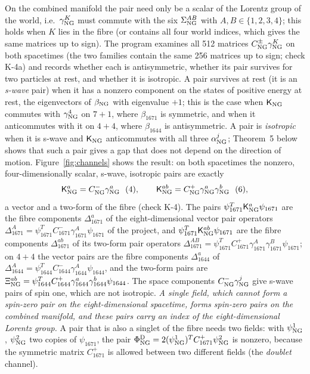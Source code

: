 On the combined manifold the pair need only be a scalar of the Lorentz group of the world, i.e.\
$\gamma^K_{\rm NG}$ must commute with the six $\Sigma^{AB}_{\rm NG}$ with $A,B\in\{1,2,3,4\}$; this holds when
$K$ lies in the fibre (or contains all four world indices, which gives the same matrices up to sign).
The program examines all 512 matrices $C^\pm_{\rm NG}\gamma^K_{\rm NG}$ on both spacetimes (the two
families contain the same 256 matrices up to sign; check K-4a) and records whether each is
antisymmetric, whether its pair survives for two particles at rest, and whether it is isotropic. A pair
survives at rest (it is an \emph{s-wave} pair) when it has a nonzero component on the states of positive
energy at rest, the eigenvectors of $\beta_{\rm NG}$ with eigenvalue $+1$; this is the case when
$\mathsf K_{\rm NG}$ commutes with $\gamma^4_{\rm NG}$ on $7+1$, where $\beta_{1671}$ is symmetric, and when
it anticommutes with it on $4+4$, where $\beta_{1644}$ is antisymmetric. A pair is \emph{isotropic} when it
is s-wave and $\mathsf K_{\rm NG}$ anticommutes with all three $\alpha^j_{\rm NG}$; Theorem~5 below shows that
such a pair gives a gap that does not depend on the direction of motion. Figure~\ref{fig:channels} shows
the result: on both spacetimes the nonzero, four-dimensionally scalar, s-wave, isotropic pairs are
exactly
\begin{equation}
\mathsf K^a_{\rm NG}=C^-_{\rm NG}\gamma^a_{\rm NG}\ \ (4),\qquad \mathsf K^{ab}_{\rm NG}=C^+_{\rm NG}\gamma^a_{\rm NG}\gamma^b_{\rm NG}\ \ (6),
\label{eq:channels}
\end{equation}
a vector and a two-form of the fibre (check K-4). The pairs $\psi^T_{1671}\mathsf K^a_{\rm NG}\psi_{1671}$ are
the fibre components $\Delta^a_{1671}$ of the eight-dimensional vector pair operators $\Delta^A_{1671}=
\psi^T_{1671}C^-_{1671}\gamma^A_{1671}\psi_{1671}$ of the project, and $\psi^T_{1671}\mathsf K^{ab}_{\rm NG}
\psi_{1671}$ are the fibre components $\Delta^{ab}_{1671}$ of its two-form pair operators
$\Delta^{AB}_{1671}=\psi^T_{1671}C^+_{1671}\gamma^A_{1671}\gamma^B_{1671}\psi_{1671}$; on $4+4$ the vector
pairs are the fibre components $\Delta^a_{1644}$ of $\Delta^A_{1644}=\psi^T_{1644}C^-_{1644}\gamma^A_{1644}
\psi_{1644}$, and the two-form pairs are $\Xi^{ab}_{\rm NG}=\psi^T_{1644}C^+_{1644}\gamma^a_{1644}
\gamma^b_{1644}\psi_{1644}$. The space components $C^-_{\rm NG}\gamma^j_{\rm NG}$ give s-wave pairs of spin
one, which are not isotropic. \emph{A single field, which cannot form a spin-zero pair on the
eight-dimensional spacetime, forms spin-zero pairs on the combined manifold, and these pairs carry an
index of the eight-dimensional Lorentz group.} A pair that is also a singlet of the fibre needs two
fields: with $\psi^1_{\rm NG}$, $\psi^2_{\rm NG}$ two copies of $\psi_{1671}$, the pair $\Phi^{\rm D}_{\rm NG}=
2(\psi^1_{\rm NG})^TC^+_{1671}\psi^2_{\rm NG}$ is nonzero, because the symmetric matrix $C^+_{1671}$ is allowed
between two different fields (the \emph{doublet} channel).


